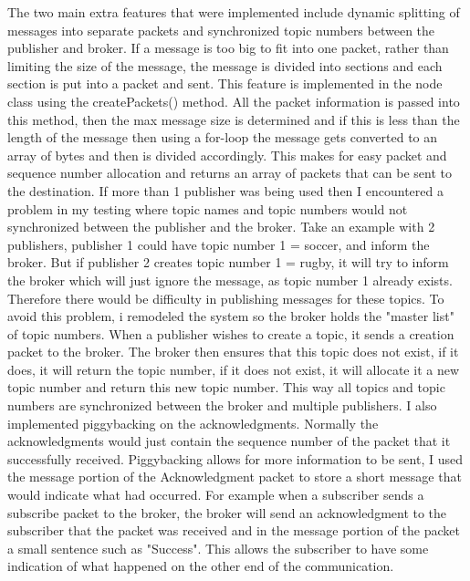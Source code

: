 \documentclass{article}
\begin{document}
The two main extra features that were implemented include dynamic splitting of messages into separate packets and synchronized topic numbers between the publisher and broker.
\newline
\newline
If a message is too big to fit into one packet, rather than limiting the size of the message, the message is divided into sections and each section is put into a packet and sent. This feature is implemented in the node class using the createPackets() method. All the packet information is passed into this method, then the max message size is determined and if this is less than the length of the message then using a for-loop the message gets converted to an array of bytes and then is divided accordingly. This makes for easy packet and sequence number allocation and returns an array of packets that can be sent to the destination.
\newline
\newline
If more than 1 publisher was being used then I encountered a problem in my testing where topic names and topic numbers would not synchronized between the publisher and the broker. Take an example with 2 publishers, publisher 1 could have topic number 1 = soccer, and inform the broker. But if publisher 2 creates topic number 1 = rugby, it will try to inform the broker which will just ignore the message, as topic number 1 already exists. Therefore there would be difficulty in publishing messages for these topics. To avoid this problem, i remodeled the system so the broker holds the "master list" of topic numbers. When a publisher wishes to create a topic, it sends a creation packet to the broker. The broker then ensures that this topic does not exist, if it does, it will return the topic number, if it does not exist, it will allocate it a new topic number and return this new topic number. This way all topics and topic numbers are synchronized between the broker and multiple publishers.
\newline
\newline
I also implemented piggybacking on the acknowledgments. Normally the acknowledgments would just contain the sequence number of the packet that it successfully received. Piggybacking allows for more information to be sent, I used the message portion of the Acknowledgment packet to store a short message that would indicate what had occurred. For example when a subscriber sends a subscribe packet to the broker, the broker will send an acknowledgment to the subscriber that the packet was received and in the message portion of the packet a small sentence such as "Success". This allows the subscriber to have some indication of what happened on the other end of the communication.
\end{document}
